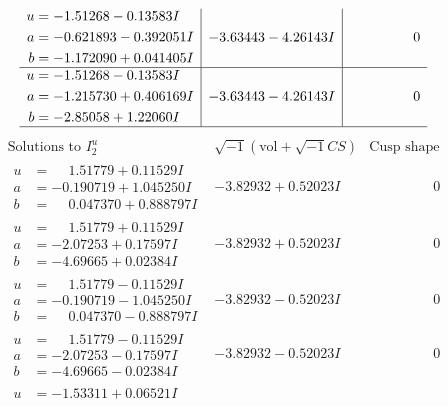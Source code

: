 \documentclass[1p]{elsarticle_modified}
\theoremstyle{definition}
\newcommand{\I}{\sqrt{-1}}
\begin{document}
$$\begin{array}{c|c|c}
\begin{aligned}
u &= -1.51268 - 0.13583 I \\
a &= -0.621893 - 0.392051 I \\
b &= -1.172090 + 0.041405 I\end{aligned}
 & -3.63443 - 4.26143 I & \phantom{-0.000000 } 0 \\ \hline\begin{aligned}
u &= -1.51268 - 0.13583 I \\
a &= -1.215730 + 0.406169 I \\
b &= -2.85058 + 1.22060 I\end{aligned}
 & -3.63443 - 4.26143 I & \phantom{-0.000000 } 0\\
 \hline 
 \end{array}$$\newpage$$\begin{array}{c|c|c}  
\text{Solutions to }I^u_{2}& \I (\text{vol} + \sqrt{-1}CS) & \text{Cusp shape}\\
 \hline 
\begin{aligned}
u &= \phantom{-}1.51779 + 0.11529 I \\
a &= -0.190719 + 1.045250 I \\
b &= \phantom{-}0.047370 + 0.888797 I\end{aligned}
 & -3.82932 + 0.52023 I & \phantom{-0.000000 } 0 \\ \hline\begin{aligned}
u &= \phantom{-}1.51779 + 0.11529 I \\
a &= -2.07253 + 0.17597 I \\
b &= -4.69665 + 0.02384 I\end{aligned}
 & -3.82932 + 0.52023 I & \phantom{-0.000000 } 0 \\ \hline\begin{aligned}
u &= \phantom{-}1.51779 - 0.11529 I \\
a &= -0.190719 - 1.045250 I \\
b &= \phantom{-}0.047370 - 0.888797 I\end{aligned}
 & -3.82932 - 0.52023 I & \phantom{-0.000000 } 0 \\ \hline\begin{aligned}
u &= \phantom{-}1.51779 - 0.11529 I \\
a &= -2.07253 - 0.17597 I \\
b &= -4.69665 - 0.02384 I\end{aligned}
 & -3.82932 - 0.52023 I & \phantom{-0.000000 } 0 \\ \hline\begin{aligned}
u &= -1.53311 + 0.06521 I \\

\end{aligned}
\end{array}$$
\end{document}
